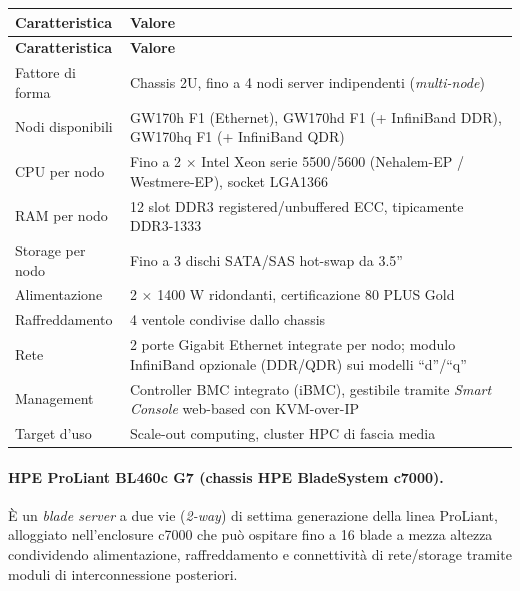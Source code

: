 \documentclass[11pt,a4paper]{article}
\begin{document}
\begin{center}
\begin{longtable}{p{4.2cm}p{9.8cm}}
\toprule
\textbf{Caratteristica} & \textbf{Valore} \\
\midrule
\endfirsthead
\toprule
\textbf{Caratteristica} & \textbf{Valore} \\
\midrule
\endhead
Fattore di forma & Chassis 2U, fino a 4 nodi server indipendenti (\emph{multi-node}) \\
Nodi disponibili & GW170h F1 (Ethernet), GW170hd F1 (+ InfiniBand DDR), GW170hq F1 (+ InfiniBand QDR) \\
CPU per nodo & Fino a 2 $\times$ Intel Xeon serie 5500/5600 (Nehalem-EP / Westmere-EP), socket LGA1366 \\
RAM per nodo & 12 slot DDR3 registered/unbuffered ECC, tipicamente DDR3-1333 \\
Storage per nodo & Fino a 3 dischi SATA/SAS hot-swap da 3.5'' \\
Alimentazione & 2 $\times$ 1400 W ridondanti, certificazione 80 PLUS Gold \\
Raffreddamento & 4 ventole condivise dallo chassis \\
Rete & 2 porte Gigabit Ethernet integrate per nodo; modulo InfiniBand opzionale (DDR/QDR) sui modelli ``d''/``q'' \\
Management & Controller BMC integrato (iBMC), gestibile tramite \emph{Smart Console} web-based con KVM-over-IP \\
Target d'uso & Scale-out computing, cluster HPC di fascia media \\
\bottomrule
\end{longtable}
\end{center}

\paragraph{HPE ProLiant BL460c G7 (chassis HPE BladeSystem c7000).}
È un \emph{blade server} a due vie (\emph{2-way}) di settima generazione della linea ProLiant, alloggiato nell'enclosure c7000 che può ospitare fino a 16 blade a mezza altezza condividendo alimentazione, raffreddamento e connettività di rete/storage tramite moduli di interconnessione posteriori.
\end{document}
